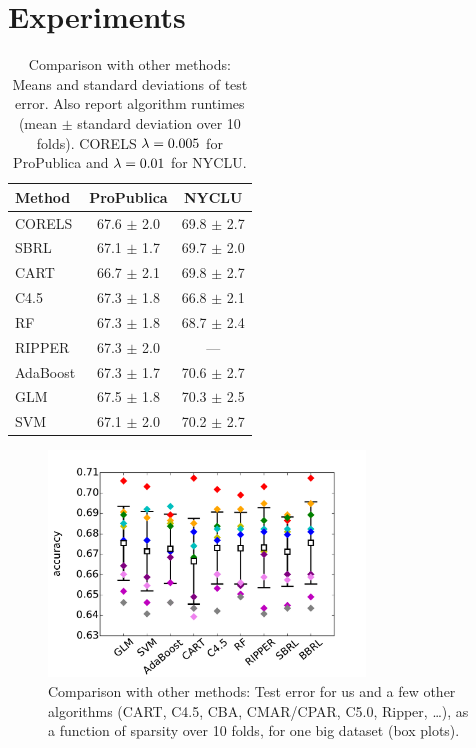 \section{Experiments}
\label{sec:experiments}

\begin{arxiv}
\begin{table}[t!]
\centering
\begin{tabular}{l | c | c}
Method & ProPublica & NYCLU \\
\hline
CORELS & 67.6 $\pm$ 2.0 & 69.8 $\pm$ 2.7 \\
SBRL & 67.1 $\pm$ 1.7 & 69.7 $\pm$ 2.0 \\
CART & 66.7 $\pm$ 2.1 & 69.8 $\pm$ 2.7 \\
C4.5 & 67.3 $\pm$ 1.8 & 66.8 $\pm$ 2.1 \\
RF & 67.3 $\pm$ 1.8 & 68.7 $\pm$ 2.4 \\
RIPPER & 67.3 $\pm$ 2.0 & --- \\
AdaBoost & 67.3 $\pm$ 1.7 & 70.6 $\pm$ 2.7 \\
GLM & 67.5 $\pm$ 1.8 & 70.3 $\pm$ 2.5 \\
SVM & 67.1 $\pm$ 2.0 & 70.2 $\pm$ 2.7 \\
\end{tabular}
\vspace{5mm}
\caption{Comparison with other methods:
Means and standard deviations of test error.
Also report algorithm runtimes (mean $\pm$ standard deviation over 10 folds).
CORELS ${{\lambda} = 0.005}$ for ProPublica and ${{\lambda} = 0.01}$ for NYCLU.}
\label{tab:comparison}
\end{table}
\end{arxiv}

\begin{arxiv}
\begin{figure}[t!]
\begin{center}
\includegraphics[width=0.75\textwidth]{figs/compare-compas.pdf}
\end{center}
\caption{Comparison with other methods:
Test error for us and a few other algorithms
(CART, C4.5, CBA, CMAR/CPAR, C5.0, Ripper, \dots),
as a function of sparsity over 10 folds, for one big dataset (box plots).}
\label{fig:comparison}
\end{figure}
\end{arxiv}

